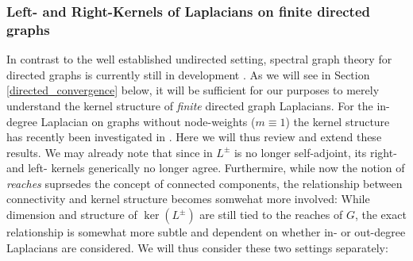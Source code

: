 \documentclass[reqno,12pt,letterpaper]{amsart}
\numberwithin{equation}{section}
\newcommand{\Lio}{L^{\pm}}
\newcommand{\1}{\mathds{1}}
\theoremstyle{definition}
\begin{document}
\subsubsection{Left- and Right-Kernels of Laplacians on finite directed graphs}\label{directed_kernels}
In contrast to the well established undirected setting, spectral graph theory for directed graphs  is currently still in development \cite{ Veerman2017RandomWO, Veerman2020APO, chung2005laplacians, li2012digraph}. 
 As we will see in Section \ref{directed_convergence} below, it will be sufficient for our purposes to merely understand the kernel structure of \emph{finite} directed graph Laplacians. For the in-degree Laplacian on graphs without node-weights ($m \equiv 1$) the kernel structure has recently been investigated in  \cite{Veerman2017RandomWO,Veerman2020APO}.
 Here we will thus review and extend these results. 
 We may already note
that since in $L^\pm$ is no longer self-adjoint, its right- and left- kernels generically no longer agree. Furthermire, while now the notion of \emph{reaches} suprsedes the concept of connected components, the relationship between connectivity and kernel structure becomes somwehat more involved: While  dimension and structure of $\ker(\Lio)$ are still tied to the reaches of $G$, the exact  relationship is  somewhat more subtle and dependent on whether in- or out-degree Laplacians are considered.
We will thus  consider 
these two
settings separately:

\medskip
\end{document}
